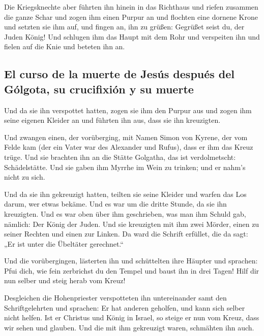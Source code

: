  Die Kriegsknechte aber führten ihn hinein in das
Richthaus und riefen zusammen die ganze Schar  und zogen
ihm einen Purpur an und flochten eine dornene Krone und setzten sie ihm
auf,  und fingen an, ihn zu grüßen: Gegrüßet seist du,
der Juden König!  Und schlugen ihm das Haupt mit dem Rohr
und verspeiten ihn und fielen auf die Knie und beteten ihn an.

\hypertarget{el-curso-de-la-muerte-de-jesuxfas-despuuxe9s-del-guxf3lgota-su-crucifixiuxf3n-y-su-muerte}{%
\subsection{El curso de la muerte de Jesús después del Gólgota, su
crucifixión y su
muerte}\label{el-curso-de-la-muerte-de-jesuxfas-despuuxe9s-del-guxf3lgota-su-crucifixiuxf3n-y-su-muerte}}

 Und da sie ihn verspottet hatten, zogen sie ihm den
Purpur aus und zogen ihm seine eigenen Kleider an und führten ihn aus,
dass sie ihn kreuzigten.

 Und zwangen einen, der vorüberging, mit Namen Simon von
Kyrene, der vom Felde kam (der ein Vater war des Alexander und Rufus),
dass er ihm das Kreuz trüge.  Und sie brachten ihn an die
Stätte Golgatha, das ist verdolmetscht: Schädelstätte. 
Und sie gaben ihm Myrrhe im Wein zu trinken; und er nahm's nicht zu
sich.

 Und da sie ihn gekreuzigt hatten, teilten sie seine
Kleider und warfen das Los darum, wer etwas bekäme.  Und
es war um die dritte Stunde, da sie ihn kreuzigten.  Und
es war oben über ihm geschrieben, was man ihm Schuld gab, nämlich: Der
König der Juden.  Und sie kreuzigten mit ihm zwei Mörder,
einen zu seiner Rechten und einen zur Linken.  Da ward
die Schrift erfüllet, die da sagt: „Er ist unter die Übeltäter
gerechnet.``

 Und die vorübergingen, lästerten ihn und schüttelten
ihre Häupter und sprachen: Pfui dich, wie fein zerbrichst du den Tempel
und baust ihn in drei Tagen!  Hilf dir nun selber und
steig herab vom Kreuz!

 Desgleichen die Hohenpriester verspotteten ihn
untereinander samt den Schriftgelehrten und sprachen: Er hat anderen
geholfen, und kann sich selber nicht helfen.  Ist er
Christus und König in Israel, so steige er nun vom Kreuz, dass wir sehen
und glauben. Und die mit ihm gekreuzigt waren, schmähten ihn auch.


